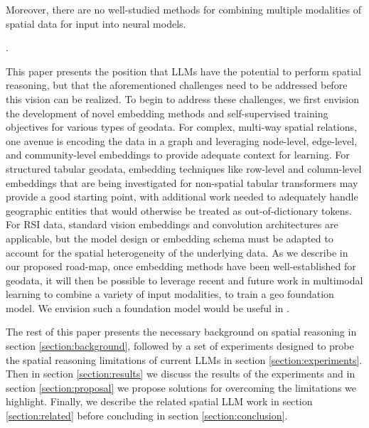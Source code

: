 Moreover, there are no well-studied methods for combining multiple modalities of spatial data for input into neural models.

 \cite{Trappolini2023}.

This paper presents the position that LLMs have the potential to perform spatial reasoning, but that the aforementioned challenges need to be addressed before this vision can be realized.
%
To begin to address these challenges, we first envision the development of novel embedding methods and self-supervised training objectives for various types of geodata.
%
For complex, multi-way spatial relations, one avenue is encoding the data in a graph and leveraging node-level, edge-level, and community-level embeddings to provide adequate context for learning.
For structured tabular geodata, embedding techniques like row-level and column-level embeddings that are being investigated for non-spatial tabular transformers may provide a good starting point, with additional work needed to adequately handle geographic entities that would otherwise be treated as out-of-dictionary tokens.
For RSI data, standard vision embeddings and convolution architectures are applicable, but the model design or embedding schema must be adapted to account for the spatial heterogeneity of the underlying data.
%
As we describe in our proposed road-map, once embedding methods have been well-established for geodata, it will then be possible to leverage recent and future work in multimodal learning to combine a variety of input modalities, to train a geo foundation model.
%
We envision such a foundation model would be useful in .

The rest of this paper presents the necessary background on spatial reasoning in section \ref{section:background}, followed by a set of experiments designed to probe the spatial reasoning limitations of current LLMs in section \ref{section:experiments}.
Then in section \ref{section:results} we discuss the results of the experiments and in section \ref{section:proposal} we propose solutions for overcoming the limitations we highlight.
Finally, we describe the related spatial LLM work in section \ref{section:related} before concluding in section \ref{section:conclusion}. 

